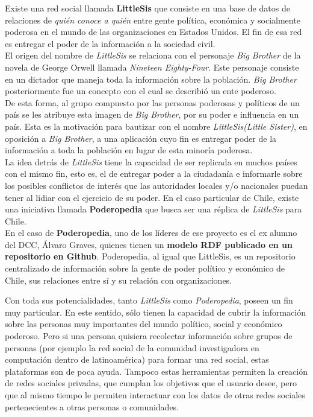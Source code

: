 
\begin{intro}
  Existe una red social llamada \textbf{LittleSis}\cite{littlesis} que consiste en una base de datos de relaciones de \emph{quién conoce a quién} entre gente política, económica y socialmente poderosa en el mundo de las organizaciones en Estados Unidos. El fin de esa red es entregar el poder de la información a la sociedad civil.\\

  El origen del nombre de \emph{LittleSis} se relaciona con el personaje \emph{Big Brother} de la novela de George Orwell llamada \emph{Nineteen Eighty-Four}. Este personaje consiste en un dictador que maneja toda la información sobre la población. \emph{Big Brother} posteriormente fue un concepto con el cual se describió un ente poderoso.\\
 
  De esta forma, al grupo compuesto por las personas poderosas y políticos de un país se les atribuye esta imagen de \emph{Big Brother}, por su poder e influencia en un país. Esta es la motivación para bautizar con el nombre \emph{LittleSis}\emph{(Little Sister)}, en oposición a \emph{Big Brother}, a una aplicación cuyo fin es entregar poder de la información a toda la población en lugar de esta minoría poderosa.\\

  La idea detrás de \emph{LittleSis} tiene la capacidad de ser replicada en muchos países con el mismo fin, esto es, el de entregar poder a la ciudadanía e informarle sobre los posibles conflictos de interés que las autoridades locales y/o nacionales puedan tener al lidiar con el ejercicio de su poder. En el caso particular de Chile, existe una iniciativa llamada \textbf{Poderopedia}\cite{poderopedia} que busca ser una réplica de \emph{LittleSis} para Chile.\\

  En el caso de \textbf{Poderopedia}, uno de los líderes de ese proyecto es el ex alumno del DCC, Álvaro Graves, quienes tienen un \textbf{modelo RDF publicado en un repositorio en Github}\cite{podervocabulary}. Poderopedia, al igual que LittleSis, es un repositorio centralizado de información sobre la gente de poder político y económico de Chile, sus relaciones entre sí y su relación con organizaciones.

  Con toda sus potencialidades, tanto \emph{LittleSis} como \emph{Poderopedia}, poseen un fin muy particular. En este sentido, sólo tienen la capacidad de cubrir la información sobre las personas muy importantes del mundo político, social y económico poderoso. Pero si una persona quisiera recolectar información sobre grupos de personas (por ejemplo la red social de la comunidad investigadora en computación dentro de latinoamérica) para formar una red social, estas plataformas son de poca ayuda. Tampoco estas herramientas permiten la creación de redes sociales privadas, que cumplan los objetivos que el usuario desee, pero que al mismo tiempo le permiten interactuar con los datos de otras redes sociales pertenecientes a otras personas o comunidades.\\


\end{intro}
